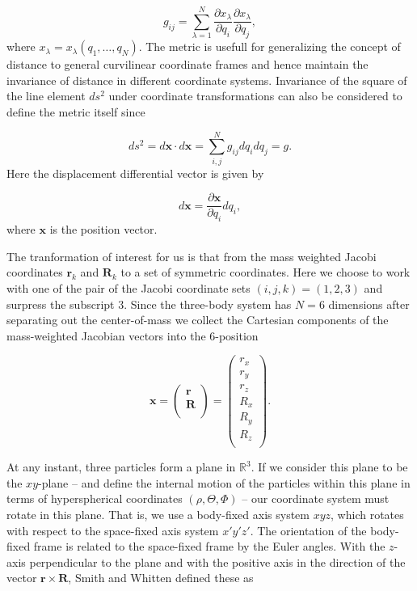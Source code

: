 \begin{equation}
g_{ij} = \sum_{\lambda = 1}^{N} \frac{\partial x_{\lambda}}{\partial q_{i}} \frac{\partial x_{\lambda}}{\partial q_{j}},
\end{equation}
where $x_{\lambda} = x_{\lambda}(q_1,\ldots,q_N)$. The metric is usefull for generalizing the concept of distance to general curvilinear coordinate frames and hence maintain the invariance of distance in different coordinate systems. Invariance of the square of the line element $d s^2$ under coordinate transformations can also be considered to define the metric itself since

\begin{equation}
d s^2 = d\mathbf{x} \cdot d\mathbf{x} = \sum_{i,j}^{N} g_{ij}  d q_{i} d q_{j} = g.
\end{equation}
Here the displacement differential vector is given by

\begin{equation}
d\mathbf{x} = \frac{\partial \mathbf{x}}{\partial q_{i}} d q_{i},
\end{equation} 
where $\mathbf{x}$ is the position vector.

The tranformation of interest for us is that from the mass weighted Jacobi coordinates $\mathbf{r}_k$ and $\mathbf{R}_k$ to a set of symmetric coordinates. Here we choose to work with one of the pair of the Jacobi coordinate sets $(i,j,k)=(1,2,3)$ and surpress the subscript $3$. Since the three-body system has $N=6$ dimensions after separating out the center-of-mass we collect the Cartesian components of the mass-weighted Jacobian vectors into the $6$-position

\begin{equation}
\mathbf{x} = 
\begin{pmatrix} 
\mathbf{r} \\
\mathbf{R} \\
\end{pmatrix} = 
\begin{pmatrix}
r_x \\
r_y \\
r_z \\
R_x \\
R_y \\
R_z\\
\end{pmatrix}.
\end{equation}

At any instant, three particles form a plane in $\mathbb{R}^3$. If we consider this plane to be the $xy$-plane -- and define the internal motion of the particles within this plane in terms of hyperspherical coordinates $(\rho, \Theta, \Phi)$ -- our coordinate system must rotate in this plane. That is, we use a body-fixed axis system $xyz$, which rotates with respect to the space-fixed axis system $x'y'z'$. The orientation of the body-fixed frame is related to the space-fixed frame by the Euler angles. With the $z$-axis perpendicular to the plane and with the positive axis in the direction of the vector $\mathbf{r} \times \mathbf{R}$, Smith and Whitten \cite{Smith_Whitten1968} defined these as   

